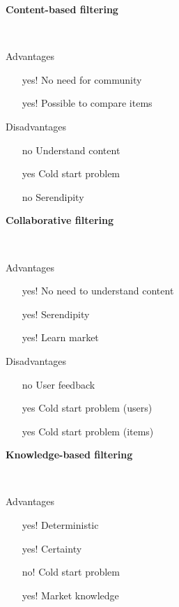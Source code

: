 \textbf{Content-based filtering}

\textit{}\\
\textit{}

Advantages\vspace{-2mm}
\begin{itemize}
\item [yes!] No need for community
\item [yes!] Possible to compare items 
\end{itemize}

\medskip
Disadvantages\vspace{-2mm}
\begin{itemize}
\item [no] Understand content
\item [yes] Cold start problem
\item [no] Serendipity
\end{itemize}


\textbf{Collaborative filtering}

\textit{}\\
\textit{}

Advantages

\begin{itemize}
\item [yes!] No need to understand content
\item [yes!] Serendipity
\item [yes!] Learn market
\end{itemize}

Disadvantages

\begin{itemize}
\item [no] User feedback
\item [yes] Cold start problem (users)
\item [yes] Cold start problem (items)
\end{itemize}


\textbf{Knowledge-based filtering}

\textit{}\\
\textit{}

Advantages

\begin{itemize}
\item [yes!] Deterministic
\item [yes!] Certainty
\item [no!] Cold start problem
\item [yes!] Market knowledge
\end{itemize}

